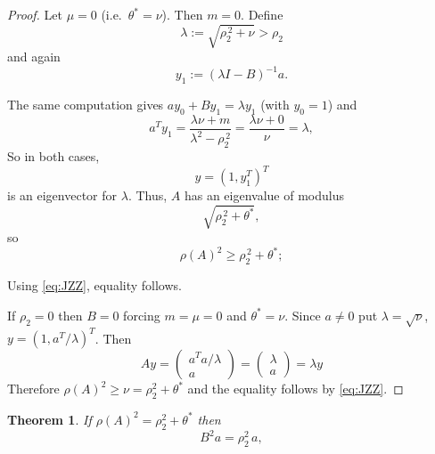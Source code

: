 \documentclass[12pt]{article}
\theoremstyle{plain}
\newtheorem{theorem}{Theorem}[section]
\numberwithin{equation}{section}
\begin{document}
\begin{proof}
		Let $\mu=0$ (i.e.\ $\theta^{*}=\nu$).
		Then $m=0$. Define
		\[
		\lambda:=\sqrt{\rho_2^{\,2}+\nu}>\rho_2
		\]
		and again
		\[
		y_1:=(\lambda I-B)^{-1}a.
		\]
		
		The same computation gives $ay_0+By_1=\lambda y_1$ (with $y_0=1$) and 
		\[
		a^{T}y_1
		=
		\frac{\lambda\nu+m}{\lambda^{2}-\rho_2^{\,2}}
		=
		\frac{\lambda\nu+0}{\nu}
		=
		\lambda,
		\]
		So in both cases,
		\[
		y=(1,y_1^T)^T
		\]
		is an eigenvector for $\lambda$.
		Thus, $A$ has an eigenvalue of modulus
		\[
		\sqrt{\rho_2^{\,2}+\theta^{*}},
		\]
		so
		\[
		\rho(A)^2\ge \rho_2^{\,2}+\theta^{*};
		\]
		
		Using \eqref{eq:JZZ}, equality follows. 
		
		If $\rho_2 = 0$ then $B=0$ forcing $m= \mu =0$ and $\theta^*=\nu$.
		Since $a \neq 0$ put $ \lambda= \sqrt{\nu}$, $y=(1, a^T/\lambda)^T$. Then 
		\begin{equation*}
			Ay= \begin{pmatrix}
				a^Ta/\lambda\\
				a 
			\end{pmatrix}=\begin{pmatrix}
				\lambda\\
				a 
			\end{pmatrix}= \lambda y
		\end{equation*}
		Therefore $\rho(A)^2 \geq \nu= \rho_2^2+ \theta^*$ and the equality follows by \eqref{eq:JZZ}.
	\end{proof}
	
	
	\begin{theorem}\label{lem:outer}
		If $\rho(A)^2=\rho_2^2+\theta^* $ then 
		\begin{equation}\label{eqn2}
			B^2a=\rho_2^2\,a,
		\end{equation}
	\end{theorem}
	
\end{document}
